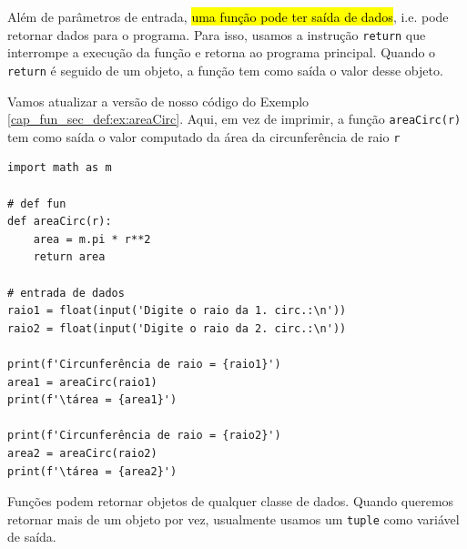 Além de parâmetros de entrada, \hl{uma função pode ter saída de dados}, i.e. pode retornar dados para o programa. Para isso, usamos a instrução \lstinline+return+ que interrompe a execução da função e retorna ao programa principal. Quando o \lstinline+return+ é seguido de um objeto, a função tem como saída o valor desse objeto.

\begin{ex}
  Vamos atualizar a versão de nosso código do Exemplo \ref{cap_fun_sec_def:ex:areaCirc}. Aqui, em vez de imprimir, a função \lstinline+areaCirc(r)+ tem como saída o valor computado da área da circunferência de raio \lstinline+r+

\begin{lstlisting}
import math as m

# def fun
def areaCirc(r):
    area = m.pi * r**2
    return area
    
# entrada de dados
raio1 = float(input('Digite o raio da 1. circ.:\n'))
raio2 = float(input('Digite o raio da 2. circ.:\n'))

print(f'Circunferência de raio = {raio1}')
area1 = areaCirc(raio1)
print(f'\tárea = {area1}')

print(f'Circunferência de raio = {raio2}')
area2 = areaCirc(raio2)
print(f'\tárea = {area2}')
\end{lstlisting}

\end{ex}

Funções podem retornar objetos de qualquer classe de dados. Quando queremos retornar mais de um objeto por vez, usualmente usamos um \lstinline+tuple+ como variável de saída.

